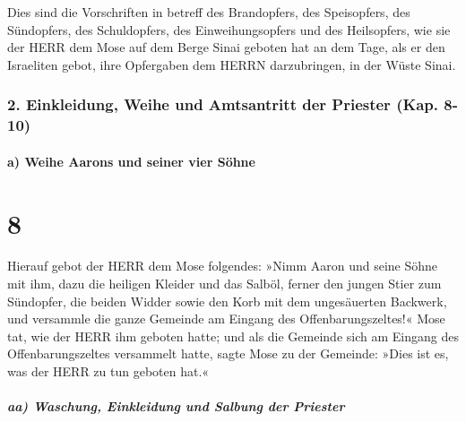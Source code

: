 Dies sind die Vorschriften in betreff des Brandopfers,
des Speisopfers, des Sündopfers, des Schuldopfers, des Einweihungsopfers
und des Heilsopfers, wie sie der HERR dem Mose auf dem
Berge Sinai geboten hat an dem Tage, als er den Israeliten gebot, ihre
Opfergaben dem HERRN darzubringen, in der Wüste Sinai.

\hypertarget{einkleidung-weihe-und-amtsantritt-der-priester-kap.-8-10}{%
\subsubsection{2. Einkleidung, Weihe und Amtsantritt der Priester (Kap.
8-10)}\label{einkleidung-weihe-und-amtsantritt-der-priester-kap.-8-10}}

\hypertarget{a-weihe-aarons-und-seiner-vier-suxf6hne}{%
\paragraph{a) Weihe Aarons und seiner vier
Söhne}\label{a-weihe-aarons-und-seiner-vier-suxf6hne}}

\hypertarget{section-7}{%
\section{8}\label{section-7}}

Hierauf gebot der HERR dem Mose folgendes:
»Nimm Aaron und seine Söhne mit ihm, dazu die heiligen
Kleider und das Salböl, ferner den jungen Stier zum Sündopfer, die
beiden Widder sowie den Korb mit dem ungesäuerten Backwerk,
und versammle die ganze Gemeinde am Eingang des
Offenbarungszeltes!« Mose tat, wie der HERR ihm geboten
hatte; und als die Gemeinde sich am Eingang des Offenbarungszeltes
versammelt hatte, sagte Mose zu der Gemeinde: »Dies ist
es, was der HERR zu tun geboten hat.«

\hypertarget{aa-waschung-einkleidung-und-salbung-der-priester}{%
\subparagraph{aa) Waschung, Einkleidung und Salbung der
Priester}\label{aa-waschung-einkleidung-und-salbung-der-priester}}

